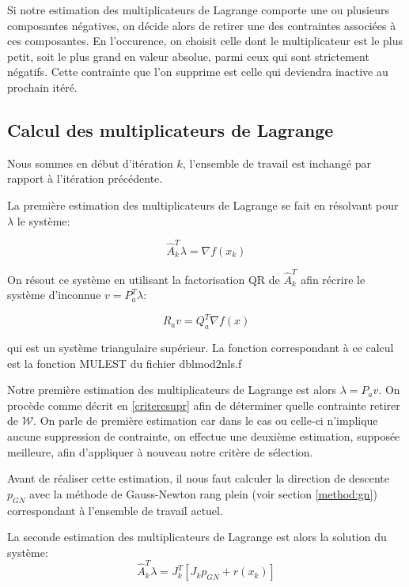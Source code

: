 \documentclass[a4paper,11pt]{article}
\newcommand{\ha}{\hat{A}}
\numberwithin{equation}{section}
\begin{document}
Si notre estimation des multiplicateurs de Lagrange comporte une ou plusieurs composantes négatives, on décide alors de retirer une des contraintes associées à ces composantes. En l'occurence, on choisit celle dont le multiplicateur est le plus petit, soit le plus grand en valeur absolue, parmi ceux qui sont strictement négatifs. Cette contrainte que l'on supprime est celle qui deviendra inactive au prochain itéré.

\subsection{Calcul des multiplicateurs de Lagrange}

Nous sommes en début d'itération $k$, l'ensemble de travail est inchangé par rapport à l'itération précédente.

La première estimation des multiplicateurs de Lagrange se fait en résolvant pour $\lambda$ le système:

\begin{equation}
\ha_{k}^T\lambda = \nabla f(x_{k})
\end{equation}

On résout ce système en utilisant la factorisation QR de $\ha_{k}^{T}$ afin récrire le système d'inconnue $v = P_{a}^{T}\lambda$:

$$ R_{a}v = Q_{a}^T\nabla f(x) $$

qui est un système triangulaire supérieur. La fonction correspondant à ce calcul est la fonction MULEST du fichier dblmod2nls.f
 
Notre première estimation des multiplicateurs de Lagrange est alors $\lambda=P_{a}v$. On procède comme décrit en \ref{criteresupr} afin de déterminer quelle contrainte retirer de $\mathcal{W}$. On parle de première estimation car dans le cas ou celle-ci n'implique aucune suppression de contrainte, on effectue une deuxième estimation, supposée meilleure, afin d'appliquer à nouveau notre critère de sélection.

Avant de réaliser cette estimation, il nous faut calculer la direction de descente $p_{GN}$ avec la méthode de Gauss-Newton rang plein (voir section \ref{method:gn}) correspondant à l'ensemble de travail actuel.

La seconde estimation des multiplicateurs de Lagrange est alors la solution du système:
\begin{equation}
\ha_{k}^T\lambda = J_{k}^T\left[J_{k}p_{GN} + r(x_{k})\right]
\end{equation}
\end{document}
